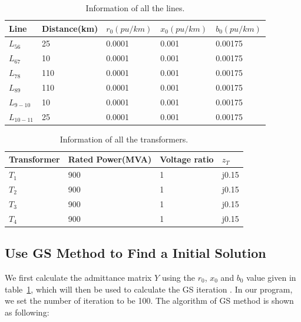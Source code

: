\documentclass[conference]{IEEEtran}
\begin{document}
\begin{table}[]
	\begin{center}
		\begin{tabular}{|l|l|l|l|l|}
			\hline
			Line & Distance(km) & $r_0(pu/km)$ & $x_0(pu/km)$ & $b_0(pu/km)$ \\ \hline
			$L_{56}$ & 25 & 0.0001 & 0.001 & 0.00175 \\ \hline
			$L_{67}$ & 10 & 0.0001 & 0.001 & 0.00175 \\ \hline
			$L_{78}$ & 110 & 0.0001 & 0.001 & 0.00175 \\ \hline
			$L_{89}$ & 110 & 0.0001 & 0.001 & 0.00175 \\ \hline
			$L_{9-10}$ & 10 & 0.0001 & 0.001 & 0.00175 \\ \hline
			$L_{10-11}$ & 25 & 0.0001 & 0.001 & 0.00175 \\ \hline
		\end{tabular}
	\end{center}
	\caption{Information of all the lines.}
	\vspace{-7mm}
	\label{tab:line1}
\end{table}

\begin{table}[H]
	\begin{center}
		\begin{tabular}{|l|l|l|l|}
			\hline
			Transformer & Rated Power(MVA) & Voltage ratio & $z_T$ \\ \hline
			$T_{1}$ & 900 & 1 & j0.15 \\ \hline
			$T_{2}$ & 900 & 1 & j0.15 \\ \hline
			$T_{3}$ & 900 & 1 & j0.15 \\ \hline
			$T_{4}$ & 900 & 1 & j0.15 \\ \hline
		\end{tabular}
	\end{center}
	\caption{Information of all the transformers.}
	\vspace{-4mm}
	\label{tab:trans1}
\end{table}

\subsection{Use GS Method to Find a Initial Solution}
We first calculate the admittance matrix $Y$ using the $r_0$, $x_0$ and $b_0$ value given in table~\ref{tab:line1}, which will then be used to calculate the GS iteration \cite{b3}. In our program, we set the number of iteration to be 100. The algorithm of GS method is shown as following:
\end{document}
